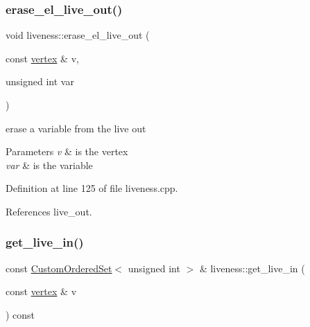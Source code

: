 \mbox{\label{classliveness_add79631c33a2be95dafa5215f9df6770}} 
\subsubsection{\texorpdfstring{erase\+\_\+el\+\_\+live\+\_\+out()}{erase\_el\_live\_out()}}
{\footnotesize\ttfamily void liveness\+::erase\+\_\+el\+\_\+live\+\_\+out (\begin{DoxyParamCaption}\item[{const \hyperlink{graph_8hpp_abefdcf0544e601805af44eca032cca14}{vertex} \&}]{v,  }\item[{unsigned int}]{var }\end{DoxyParamCaption})}



erase a variable from the live out 


\begin{DoxyParams}{Parameters}
{\em v} & is the vertex \\
\hline
{\em var} & is the variable \\
\hline
\end{DoxyParams}


Definition at line 125 of file liveness.\+cpp.



References live\+\_\+out.

\mbox{\label{classliveness_a13fa885bb8a47eccb3483da6333665fd}} 
\subsubsection{\texorpdfstring{get\+\_\+live\+\_\+in()}{get\_live\_in()}}
{\footnotesize\ttfamily const \hyperlink{classCustomOrderedSet}{Custom\+Ordered\+Set}$<$ unsigned int $>$ \& liveness\+::get\+\_\+live\+\_\+in (\begin{DoxyParamCaption}\item[{const \hyperlink{graph_8hpp_abefdcf0544e601805af44eca032cca14}{vertex} \&}]{v }\end{DoxyParamCaption}) const}



